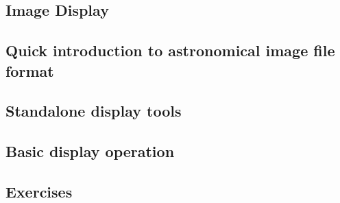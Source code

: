 \documentclass[12pt]{article}
\begin{document}
\subsection*{Image Display}
\subsection*{Quick introduction to astronomical image file format}
\subsection*{Standalone display tools}
\subsection*{Basic display operation}
\subsection*{Exercises}
\end{document}
